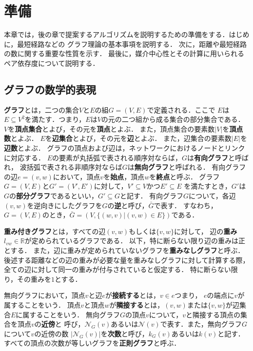 \chapter{準備}
\label{chap:preliminary}
本章では，後の章で提案するアルゴリズムを説明するための準備をする．はじめに，最短経路などの
グラフ理論の基本事項を説明する．
次に，距離や最短経路の数に関する重要な性質を示す．
最後に，媒介中心性とその計算に用いられるペア依存度について説明する．

\section{グラフの数学的表現}
\label{sect:graph-theory}

\textbf{グラフ}とは，二つの集合$V$と$E$の組$G=(V,E)$で定義される．ここで
$E$は$E\subseteq V^2$を満たす．つまり，$E$は$V$の元の二つ組から成る集合の部分集合である．
$V$を\textbf{頂点集合}とよび，その元を\textbf{頂点}とよぶ．
また，頂点集合の要素数$|V|$を\textbf{頂点数}とよぶ．
$E$を\textbf{辺集合}とよび，その元を\textbf{辺}とよぶ．
また，辺集合の要素数$|E|$を\textbf{辺数}とよぶ．
グラフの頂点および辺は，ネットワークにおけるノードとリンクに対応する．
$E$の要素が丸括弧で表される順序対ならば，$G$は\textbf{有向グラフ}と呼ばれ，
波括弧で表される非順序対ならば$G$は\textbf{無向グラフ}と呼ばれる．
有向グラフの辺$e=(v,w)$において，頂点$v$を\textbf{始点}，頂点$w$を\textbf{終点}と呼ぶ．
グラフ$G=(V,E)$と$G'=(V',E')$に対して，$V'\subseteq V$かつ$E'\subseteq E$
を満たすとき，$G'$は$G$の\textbf{部分グラフ}であるといい，$G'\subseteq G$と記す．
有向グラフ$G$について，各辺$(v,w)$を逆向きにしたグラフを$G$の\textbf{逆}と呼び，$\bar{G}$で表す．
すなわち，$G=(V,E)$のとき，$\bar{G}=(V,\{(w,v)|(v,w)\in E\})$である．

\textbf{重み付きグラフ}とは，すべての辺$(v,w)$もしくは$\{v,w\}$に対して，
辺の\textbf{重み}$l_{vw}\in\mathbb{R}$が定められているグラフである．
以下，特に断らない限り辺の重みは正とする．
また，辺に重みが定められていないグラフを\textbf{重みなしグラフ}と呼ぶ．
後述する距離などの辺の重みが必要な量を重みなしグラフに対して計算する際，
全ての辺に対して同一の重みが付与されていると仮定する．
特に断らない限り，その重みを$1$とする．

無向グラフにおいて，頂点$v$と辺$e$が\textbf{接続する}とは，$v\in e$つまり，
$e$の端点に$v$が属することをいう．
頂点$v$と頂点$w$が\textbf{隣接する}とは，$(v,w)$または$\{v,w\}$が辺集合$E$に属することをいう．
無向グラフ$G$の頂点$v$について，$v$と隣接する頂点の集合を頂点$v$の\textbf{近傍}と
呼び，$\mathcal{N}_G(v)$あるいは$\mathcal{N}(v)$で表す．また，無向グラフ$G$について$v$の近傍の数
$|\mathcal{N}_G(v)|$を\textbf{次数}と呼び，$k_G(v)$あるいは$k(v)$と記す．
すべての頂点の次数が等しいグラフを\textbf{正則グラフ}と呼ぶ．

